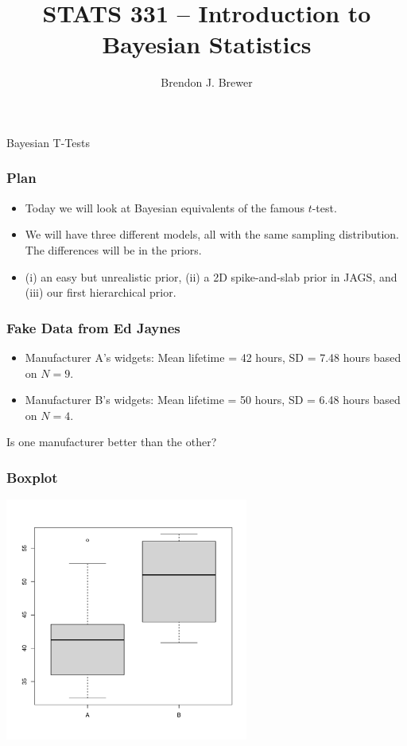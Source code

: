 \documentclass{beamer}
\author{Brendon J. Brewer}
\title{STATS 331 -- Introduction to Bayesian Statistics}
\institute{The University of Auckland}
\date{}
\begin{document}
\frame{\titlepage}

\begin{frame}
\centering
\Large
Bayesian T-Tests

\end{frame}


\begin{frame}
\frametitle{Plan}

\begin{itemize}
\item Today we will look at Bayesian equivalents of the famous $t$-test.\pause
\item We will have three different models, all with the same
sampling distribution. The differences will be in the priors.\pause
\item (i) an easy but unrealistic prior, (ii) a 2D
spike-and-slab prior in JAGS, and (iii) our first hierarchical prior.
\end{itemize}

\end{frame}

\begin{frame}
\frametitle{Fake Data from Ed Jaynes}

\begin{itemize}
\item Manufacturer A's widgets:
Mean lifetime = 42 hours, SD = 7.48 hours based on $N=9$.\pause
\item Manufacturer B's widgets:
Mean lifetime = 50 hours, SD = 6.48 hours based on $N=4$.\pause
\end{itemize}

Is one manufacturer better than the other?

\end{frame}

\begin{frame}
\frametitle{Boxplot}

\begin{center}
\includegraphics[width=0.6\textwidth]{images/widgets_boxplot.pdf}
\end{center}

\end{frame}
\end{document}
